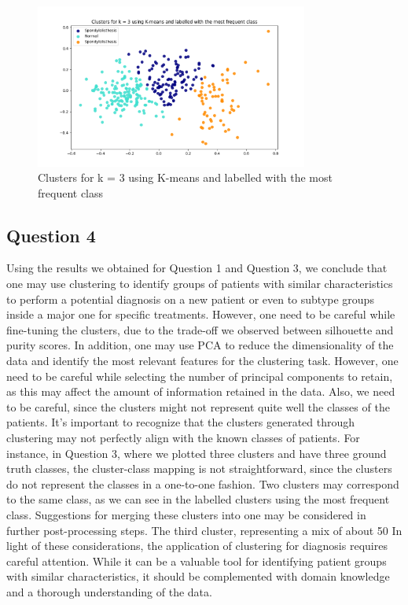\documentclass{article}
\begin{document}
\begin{figure}[H]
  \centering
  \includegraphics[width=0.8\textwidth]{images/clusters_frequency.png}
  \caption{Clusters for k = 3 using K-means and labelled with the most frequent class}
  \label{fig:clusters_frequency}
\end{figure}

\subsection*{Question 4}

Using the results we obtained for Question 1 and Question 3, we conclude that one may use clustering to identify groups of patients with similar characteristics to perform a potential diagnosis on a new patient or even to subtype groups inside a major one for specific treatments. However, one need to be careful while fine-tuning the clusters, due to the trade-off we observed between silhouette and purity scores.
In addition, one may use PCA to reduce the dimensionality of the data and identify the most relevant features for the clustering task.
However, one need to be careful while selecting the number of principal components to retain, as this may affect the amount of information retained in the data. Also, we need to be careful, since the clusters might not represent quite well the classes of the patients.
It's important to recognize that the clusters generated through clustering may not perfectly align with the known classes of patients.
For instance, in Question 3, where we plotted three clusters and have three ground truth classes, the cluster-class mapping is not straightforward, since the clusters do not represent the classes in a one-to-one fashion.
Two clusters may correspond to the same class, as we can see in the labelled clusters using the most frequent class. Suggestions for merging these clusters into one may be considered in further post-processing steps.
The third cluster, representing a mix of about 50%
In light of these considerations, the application of clustering for diagnosis requires careful attention. While it can be a valuable tool for identifying patient groups with similar characteristics, it should be complemented with domain knowledge and a thorough understanding of the data.
\end{document}
